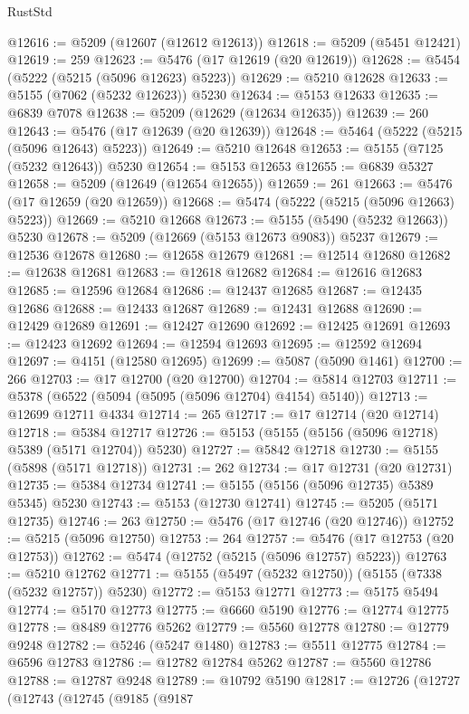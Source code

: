 \begin{lexlean}{RustStd}
\begin{coremodule}
@12616 := @5209 (@12607 (@12612 @12613))
@12618 := @5209 (@5451 @12421)
@12619 := 259
@12623 := @5476 (@17 @12619 (@20 @12619))
@12628 := @5454 (@5222 (@5215 (@5096 @12623) @5223))
@12629 := @5210 @12628
@12633 := @5155 (@7062 (@5232 @12623)) @5230
@12634 := @5153 @12633
@12635 := @6839 @7078
@12638 := @5209 (@12629 (@12634 @12635))
@12639 := 260
@12643 := @5476 (@17 @12639 (@20 @12639))
@12648 := @5464 (@5222 (@5215 (@5096 @12643) @5223))
@12649 := @5210 @12648
@12653 := @5155 (@7125 (@5232 @12643)) @5230
@12654 := @5153 @12653
@12655 := @6839 @5327
@12658 := @5209 (@12649 (@12654 @12655))
@12659 := 261
@12663 := @5476 (@17 @12659 (@20 @12659))
@12668 := @5474 (@5222 (@5215 (@5096 @12663) @5223))
@12669 := @5210 @12668
@12673 := @5155 (@5490 (@5232 @12663)) @5230
@12678 := @5209 (@12669 (@5153 @12673 @9083)) @5237
@12679 := @12536 @12678
@12680 := @12658 @12679
@12681 := @12514 @12680
@12682 := @12638 @12681
@12683 := @12618 @12682
@12684 := @12616 @12683
@12685 := @12596 @12684
@12686 := @12437 @12685
@12687 := @12435 @12686
@12688 := @12433 @12687
@12689 := @12431 @12688
@12690 := @12429 @12689
@12691 := @12427 @12690
@12692 := @12425 @12691
@12693 := @12423 @12692
@12694 := @12594 @12693
@12695 := @12592 @12694
@12697 := @4151 (@12580 @12695)
@12699 := @5087 (@5090 @1461)
@12700 := 266
@12703 := @17 @12700 (@20 @12700)
@12704 := @5814 @12703
@12711 := @5378 (@6522 (@5094 (@5095 (@5096 @12704) @4154) @5140))
@12713 := @12699 @12711 @4334
@12714 := 265
@12717 := @17 @12714 (@20 @12714)
@12718 := @5384 @12717
@12726 := @5153 (@5155 (@5156 (@5096 @12718) @5389 (@5171 @12704)) @5230)
@12727 := @5842 @12718
@12730 := @5155 (@5898 (@5171 @12718))
@12731 := 262
@12734 := @17 @12731 (@20 @12731)
@12735 := @5384 @12734
@12741 := @5155 (@5156 (@5096 @12735) @5389 @5345) @5230
@12743 := @5153 (@12730 @12741)
@12745 := @5205 (@5171 @12735)
@12746 := 263
@12750 := @5476 (@17 @12746 (@20 @12746))
@12752 := @5215 (@5096 @12750)
@12753 := 264
@12757 := @5476 (@17 @12753 (@20 @12753))
@12762 := @5474 (@12752 (@5215 (@5096 @12757) @5223))
@12763 := @5210 @12762
@12771 := @5155 (@5497 (@5232 @12750)) (@5155 (@7338 (@5232 @12757)) @5230)
@12772 := @5153 @12771
@12773 := @5175 @5494
@12774 := @5170 @12773
@12775 := @6660 @5190
@12776 := @12774 @12775
@12778 := @8489 @12776 @5262
@12779 := @5560 @12778
@12780 := @12779 @9248
@12782 := @5246 (@5247 @1480)
@12783 := @5511 @12775
@12784 := @6596 @12783
@12786 := @12782 @12784 @5262
@12787 := @5560 @12786
@12788 := @12787 @9248
@12789 := @10792 @5190
@12817 := @12726
    (@12727
      (@12743
        (@12745
          (@9185
            (@9187

\end{coremodule}
\end{lexlean}
